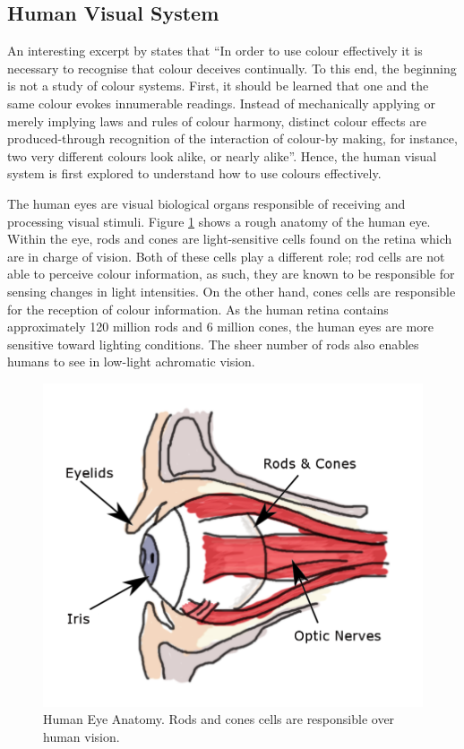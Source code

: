 \subsection{Human Visual System}
An interesting excerpt by  states that ``In order to use colour effectively it is necessary to recognise that colour deceives continually. To this end, the beginning is not a study of colour systems.
First, it should be learned that one and the same colour evokes innumerable readings. Instead of mechanically applying or merely implying laws and rules of colour harmony, distinct colour effects are produced-through recognition of the interaction of colour-by making, for instance, two very different colours look alike, or nearly alike''. Hence, the human visual system is first explored to understand how to use colours effectively.

\label{section:eyes}
The human eyes are visual biological organs responsible of receiving and
processing visual stimuli. Figure \ref{fig:eyes} shows a rough anatomy of
the human eye. Within the eye, rods and cones are light-sensitive cells
found on the retina which are in charge of vision. Both of these cells play
a different role; rod cells are not able to perceive colour information, as such, they are known to be responsible for sensing changes in light intensities.
On the other hand, cones cells are responsible for the reception of colour
information. As the human retina contains approximately 120 million rods and
6 million cones, the human eyes are more sensitive toward lighting conditions.
The sheer number of rods also enables humans to see in low-light achromatic
vision.


\begin{figure}[hbt!]\centering
 \includegraphics[width=.5\textwidth]{image/lit/rodsandconscolored.png}
 \caption[Human Eye Anatomy]{Human Eye Anatomy. Rods and cones cells are
 responsible over human vision. %
 }
 \label{fig:eyes}
\end{figure}

